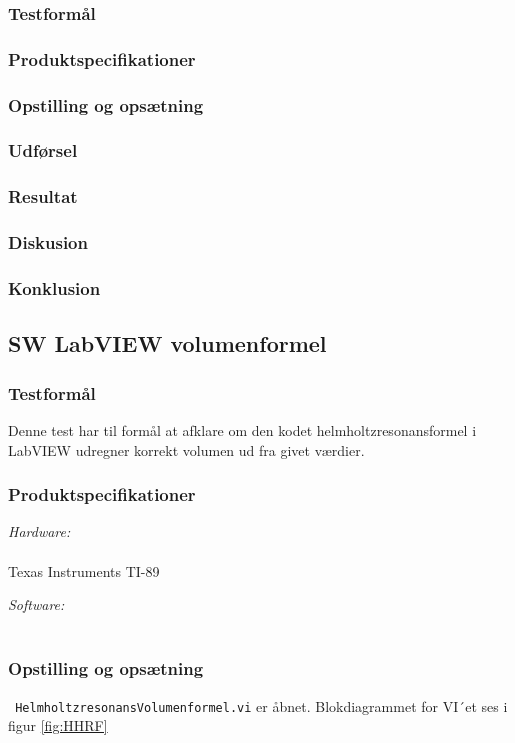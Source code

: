 \subsubsection{Testformål}
\subsubsection{Produktspecifikationer}
\subsubsection{Opstilling og opsætning}
\subsubsection{Udførsel}
\subsubsection{Resultat}
\subsubsection{Diskusion}
\subsubsection{Konklusion}

\subsection{SW LabVIEW volumenformel}	
\subsubsection{Testformål}
		Denne test har til formål at afklare om den kodet helmholtzresonansformel i LabVIEW udregner korrekt volumen ud fra givet værdier. 
		\subsubsection{Produktspecifikationer}
	
		\textit{Hardware:}\\
		\PC\\
		Texas Instruments TI-89
	
		\textit{Software:}\\
		\labview\\
	
		\subsubsection{Opstilling og opsætning}
		\texttt{ HelmholtzresonansVolumenformel.vi} er åbnet. Blokdiagrammet for VI´et ses i figur \ref{fig:HHRF} 
		

